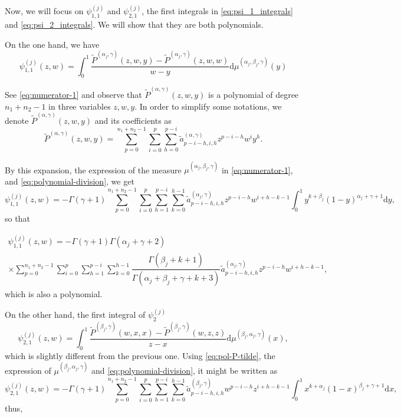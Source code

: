 \documentclass[11pt,reqno]{amsart}
\newcommand{\dr}{\mathrm{d}}
\theoremstyle{definition}
\begin{document}
Now, we will focus on $\psi_{1,1}^{(j)}$ and $\psi_{2,1}^{(j)}$, the first integrals in \eqref{eq:psi_1_integrals} and \eqref{eq:psi_2_integrals}. We will show that they are both polynomials.

On the one hand, we have
$$
\psi_{1,1}^{(j)}(z,w)=\int_0^1 \dfrac{\tilde{P}^{(\alpha_j,\gamma)}(z,w,y)-\tilde{P}^{(\alpha_j,\gamma)}(z,w,w)}{w-y}\dr \mu^{(\alpha_j,\beta_j,\gamma)}(y)
$$

See \eqref{eq:numerator-1} and observe that $\tilde P^{(\alpha,\gamma)} (z,w,y)$ is a polynomial of degree $n_1+n_2-1$ in three variables $z,w,y$. In order to simplify some notations, we denote $\tilde P^{(\alpha,\gamma)} (z,w,y)$ and its coefficients as
\begin{equation}
    \label{eq:pol-P-tilde}
    \tilde P^{(\alpha,\gamma)} (z,w,y) = \sum_{p=0}^{n_1+n_2-1}\sum_{i=0}^p\sum_{h=0}^{p-i}\tilde a_{p-i-h,i,h}^{(\alpha,\gamma)}z^{p-i-h}w^i y^h.
\end{equation}

By this expansion, the expression of the measure $\mu^{(\alpha_j,\beta_j,\gamma)}$ in \eqref{eq:numerator-1}, and \eqref{eq:polynomial-division}, we get
$$
\psi_{1,1}^{(j)}(z,w)=-\Gamma(\gamma+1)\sum_{p=0}^{n_1+n_2-1}\sum_{i=0}^p\sum_{h=1}^{p-i}\sum_{k=0}^{h-1}\tilde a_{p-i-h,i,h}^{(\alpha_j,\gamma)}z^{p-i-h}w^{i+h-k-1}\int_0^1 y^{k+\beta_j}(1-y)^{\alpha_j+\gamma+1}\dr y,
$$
so that

\begin{multline}
 \label{eq:psi_11}
\psi_{1,1}^{(j)}(z,w)= -\Gamma(\gamma+1)\Gamma(\alpha_j+\gamma+2) \\ \times \sum_{p=0}^{n_1+n_2-1}\sum_{i=0}^p\sum_{h=1}^{p-i}\sum_{k=0}^{h-1}\dfrac{\Gamma(\beta_j+k+1)}{\Gamma(\alpha_j+\beta_j+\gamma+k+3)}\tilde a_{p-i-h,i,h}^{(\alpha_j,\gamma)}z^{p-i-h}w^{i+h-k-1},
\end{multline}
which is also a polynomial.

On the other hand, the first integral of $\psi^{(j)}_2$
$$
\psi_{2,1}^{(j)}(z,w)=\int_0^1 \dfrac{\tilde P^{(\beta_j,\gamma)}(w,x,x)-\tilde P^{(\beta_j,\gamma)}(w,z,z)}{z-x}\dr \mu^{(\beta_j,\alpha_j,\gamma)}(x),
$$
which is slightly different from the previous one. Using \eqref{eq:pol-P-tilde}, the expression of $\mu^{(\beta_j,\alpha_j,\gamma)}$ and \eqref{eq:polynomial-division}, it might be written as
$$
\psi_{2,1}^{(j)}(z,w)=-\Gamma(\gamma+1)\sum_{p=0}^{n_1+n_2-1}\sum_{i=0}^p\sum_{h=1}^{p-i}\sum_{k=0}^{h-1}\tilde a_{p-i-h,i,h}^{(\beta_j,\gamma)}w^{p-i-h}z^{i+h-k-1}\int_0^1 x^{k+\alpha_j}(1-x)^{\beta_j+\gamma+1}\dr x,
$$
thus,
\end{document}
